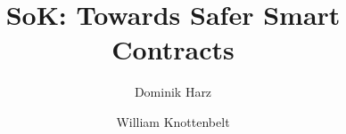 \title{SoK: Towards Safer Smart Contracts}
\author{Dominik Harz \and William Knottenbelt}



\maketitle















